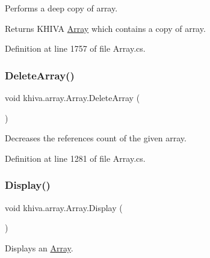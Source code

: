 Performs a deep copy of array. 

\begin{DoxyReturn}{Returns}
K\+H\+I\+VA \mbox{\hyperlink{classkhiva_1_1array_1_1_array}{Array}} which contains a copy of array.
\end{DoxyReturn}


Definition at line 1757 of file Array.\+cs.

\mbox{\label{classkhiva_1_1array_1_1_array_abb95e64e8c3514136fe8a5fb2a0e929d}} 
\subsubsection{\texorpdfstring{Delete\+Array()}{DeleteArray()}}
{\footnotesize\ttfamily void khiva.\+array.\+Array.\+Delete\+Array (\begin{DoxyParamCaption}{ }\end{DoxyParamCaption})\hspace{0.3cm}{\ttfamily [inline]}}



Decreases the references count of the given array. 



Definition at line 1281 of file Array.\+cs.

\mbox{\label{classkhiva_1_1array_1_1_array_adf556e2b36f77d285c92c1fbae9f59bb}} 
\subsubsection{\texorpdfstring{Display()}{Display()}}
{\footnotesize\ttfamily void khiva.\+array.\+Array.\+Display (\begin{DoxyParamCaption}{ }\end{DoxyParamCaption})\hspace{0.3cm}{\ttfamily [inline]}}



Displays an \mbox{\hyperlink{classkhiva_1_1array_1_1_array}{Array}}. 



